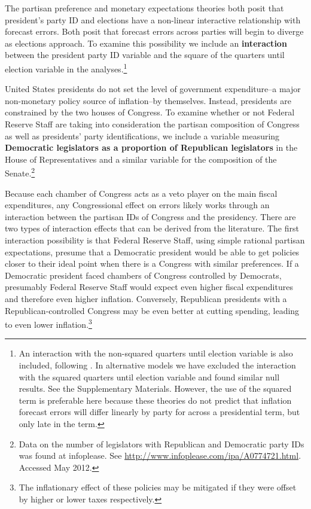 \documentclass[a4paper]{article}\usepackage[]{graphicx}\usepackage[]{color}
\begin{document}
The partisan preference and monetary expectations theories both posit that president's party ID and elections have a non-linear interactive relationship with forecast errors. Both posit that forecast errors across parties will begin to diverge as elections approach. To examine this possibility we include an \textbf{interaction} between the president party ID variable and the square of the quarters until election variable in the analyses.\footnote{An interaction with the non-squared quarters until election variable is also included, following \citep{Brambor2006}. In alternative models we have excluded the interaction with the squared quarters until election variable and found similar null results. See the Supplementary Materials. However, the use of the squared term is preferable here because these theories do not predict that inflation forecast errors will differ linearly by party for across a presidential term, but only late in the term.}

United States presidents do not set the level of government expenditure--a major non-monetary policy source of inflation--by themselves. Instead, presidents are constrained by the two houses of Congress. To examine whether or not Federal Reserve Staff are taking into consideration the partisan composition of Congress as well as presidents' party identifications, we include a variable measuring {\bf{Democratic legislators as a proportion of Republican legislators}} in the House of Representatives and a similar variable for the composition of the Senate.\footnote{Data on the number of legislators with Republican and Democratic party IDs was found at infoplease. See {\url{http://www.infoplease.com/ipa/A0774721.html}}. Accessed May 2012.} 

Because each chamber of Congress acts as a veto player on the main fiscal expenditures, any Congressional effect on errors likely works through an interaction between the partisan IDs of Congress and the presidency. There are two types of interaction effects that can be derived from the literature. The first interaction possibility is that Federal Reserve Staff, using simple rational partisan expectations, presume that a Democratic president would be able to get policies closer to their ideal point when there is a Congress with similar preferences. If a Democratic president faced chambers of Congress controlled by Democrats, presumably Federal Reserve Staff would expect even higher fiscal expenditures and therefore even higher inflation. Conversely, Republican presidents with a Republican-controlled Congress may be even better at cutting spending, leading to even lower inflation.\footnote{The inflationary effect of these policies may be mitigated if they were offset by higher or lower taxes respectively.}
\end{document}
